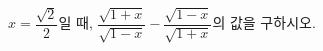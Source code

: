 \hspace*{2mm}\begin{minipage}[t]{\dimexpr\linewidth-2mm\relax}\vspace{0pt}
$x=\dfrac{\sqrt{2}}{2}$일 때, $\dfrac{\sqrt{1+x}}{\sqrt{1-x}}-\dfrac{\sqrt{1-x}}{\sqrt{1+x}}$의 값을 구하시오.\end{minipage}
